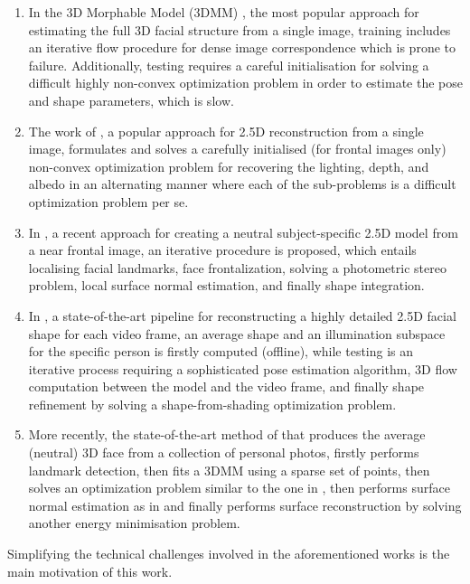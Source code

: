 \begin{enumerate}
\item In the 3D Morphable Model (3DMM) \cite{blanz1999morphable,
    romdhani2005estimating}, the most popular approach for estimating
  the full 3D facial structure from a single image, training includes
  an iterative flow procedure for dense image correspondence which is
  prone to failure. Additionally, testing requires a careful
  initialisation for solving a difficult highly non-convex
  optimization problem in order to estimate the pose and shape
  parameters, which is slow.
\item The work of \cite{kemelmacher20113d}, a popular approach for
  2.5D reconstruction from a single image, formulates and solves a
  carefully initialised (for frontal images only) non-convex
  optimization problem for recovering the lighting, depth, and albedo
  in an alternating manner where each of the sub-problems is a
  difficult optimization problem per se.
\item In \cite{kemelmacher2011face}, a recent approach for
  creating a neutral subject-specific 2.5D model from a near frontal
  image, an iterative procedure is proposed, which entails localising
  facial landmarks, face frontalization, solving a photometric stereo
  problem, local surface normal estimation, and finally shape
  integration.
\item In \cite{suwajanakorn2014total}, a state-of-the-art pipeline for
  reconstructing a highly detailed 2.5D facial shape for each video
  frame, an average shape and an illumination subspace for the
  specific person is firstly computed (offline), while testing is an
  iterative process requiring a sophisticated pose estimation
  algorithm, 3D flow computation between the model and the video
  frame, and finally shape refinement by solving a shape-from-shading
  optimization problem.
\item More recently, the state-of-the-art method of
  \cite{roth2016adaptive} that produces the average (neutral) 3D face
  from a collection of personal photos, firstly performs landmark
  detection, then fits a 3DMM using a sparse set of points, then
  solves an optimization problem similar to the one in
  \cite{kemelmacher2011face}, then performs surface normal estimation
  as in \cite{kemelmacher2011face} and finally performs surface
  reconstruction by solving another energy minimisation problem.
\end{enumerate}

Simplifying the technical challenges involved in the aforementioned
works is the main motivation of this work.

